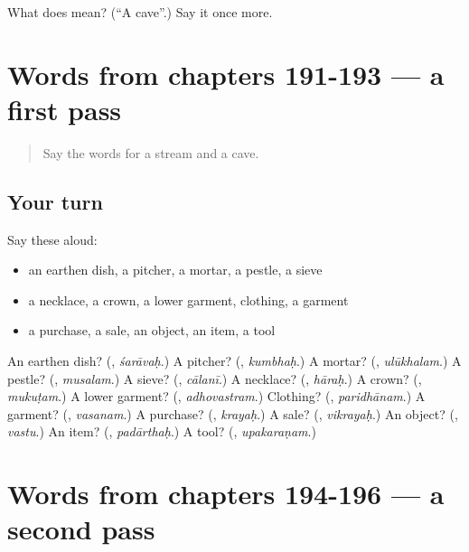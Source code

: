 \begin{tcolorbox}[breakable,colback=teal!4,colframe=teal!35!black,title={Before you move on}]
What does  mean? (\textquotedblleft{}A cave\textquotedblright{}.) Say it once more.
\end{tcolorbox}
\section[(dialogue)]{Words from chapters 191-193 — a first pass}

\label{lesson:SA-R196-first-pass-words-from-chapters-191-193}



\begin{quote}
Say the words for a stream and a cave.
\end{quote}

\subsection*{Your turn}
Say these aloud:

\begin{itemize}
\raggedright
  \item an earthen dish, a pitcher, a mortar, a pestle, a sieve
  \item a necklace, a crown, a lower garment, clothing, a garment
  \item a purchase, a sale, an object, an item, a tool
\end{itemize}

\begin{tcolorbox}[breakable,colback=teal!4,colframe=teal!35!black,title={Before you move on}]
An earthen dish? (\textbf{}, \emph{śarāvaḥ}.) A pitcher? (\textbf{}, \emph{kumbhaḥ}.) A mortar? (\textbf{}, \emph{ulūkhalam}.) A pestle? (\textbf{}, \emph{musalam}.) A sieve? (\textbf{}, \emph{cālanī}.) A necklace? (\textbf{}, \emph{hāraḥ}.) A crown? (\textbf{}, \emph{mukuṭam}.) A lower garment? (\textbf{}, \emph{adhovastram}.) Clothing? (\textbf{}, \emph{paridhānam}.) A garment? (\textbf{}, \emph{vasanam}.) A purchase? (\textbf{}, \emph{krayaḥ}.) A sale? (\textbf{}, \emph{vikrayaḥ}.) An object? (\textbf{}, \emph{vastu}.) An item? (\textbf{}, \emph{padārthaḥ}.) A tool? (\textbf{}, \emph{upakaraṇam}.)
\end{tcolorbox}
\section[(dialogue)]{Words from chapters 194-196 — a second pass}

